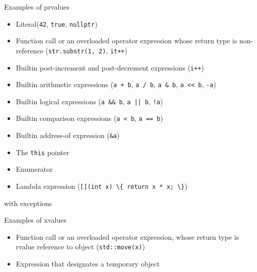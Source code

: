 \begin{frame}{Examples of prvalues}{}
  \begin{examples}
    \begin{itemize}
    \item
      Literal\manualfootnote (\lstinline!42!, \lstinline!true!, \lstinline!nullptr!)
    \item
      Function call or an overloaded operator expression whose return type is non-reference (\lstinline!str.substr(1, 2)!, \lstinline!it++!)
    \item
      Builtin post-increment and post-decrement expressions (\lstinline!i++!)
    \item
      Builtin arithmetic expressions (\lstinline!a + b!, \lstinline!a / b!, \lstinline!a & b!, \lstinline!a << b!, \lstinline!-a!)
    \item
      Builtin logical expressions (\lstinline!a && b!, \lstinline!a || b!, \lstinline|!a|)
    \item
      Builtin comparison expressions (\lstinline!a < b!, \lstinline!a == b!)
    \item
      Builtin address-of expression (\lstinline!&a!)
    \item
      The \lstinline!this! pointer
    \item
      Enumerator
    \item
      Lambda expression (\lstinline![](int x) \{ return x * x; \}!)
    \end{itemize}

    \raggedleft
    \footnotesize
    \manualfootnote with exceptions
  \end{examples}
\end{frame}

\begin{frame}{Examples of xvalues}{}
  \begin{examples}
    \begin{itemize}
    \item
      Function call or an overloaded operator expression, whose return type is rvalue reference to object (\lstinline!std::move(x)!)
    \item
      Expression that designates a temporary object
    \end{itemize}
  \end{examples}
\end{frame}

